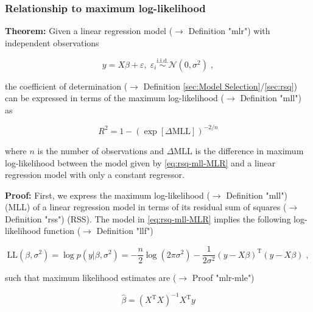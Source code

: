 \documentclass[a4paper,12pt]{book}
\begin{document}
\subsubsection[\textbf{Relationship to maximum log-likelihood}]{Relationship to maximum log-likelihood} \label{sec:rsq-mll}

\vspace{1em}
\textbf{Theorem:} Given a linear regression model ($\rightarrow$ Definition "mlr") with independent observations

\begin{equation} \label{eq:rsq-mll-MLR}
y = X\beta + \varepsilon, \; \varepsilon_i \overset{\mathrm{i.i.d.}}{\sim} \mathcal{N}(0, \sigma^2) \; ,
\end{equation}

the coefficient of determination ($\rightarrow$ Definition \ref{sec:Model Selection}/\ref{sec:rsq}) can be expressed in terms of the maximum log-likelihood ($\rightarrow$ Definition "mll") as

\begin{equation} \label{eq:rsq-mll-R2-MLL}
R^2 = 1 - \left( \exp[\Delta\mathrm{MLL}] \right)^{-2/n}
\end{equation}

where $n$ is the number of observations and $\Delta\mathrm{MLL}$ is the difference in maximum log-likelihood between the model given by \eqref{eq:rsq-mll-MLR} and a linear regression model with only a constant regressor.


\vspace{1em}
\textbf{Proof:} First, we express the maximum log-likelihood ($\rightarrow$ Definition "mll") (MLL) of a linear regression model in terms of its residual sum of squares ($\rightarrow$ Definition "rss") (RSS). The model in \eqref{eq:rsq-mll-MLR} implies the following log-likelihood function ($\rightarrow$ Definition "llf")

\begin{equation} \label{eq:rsq-mll-MLR-LL}
\mathrm{LL}(\beta,\sigma^2) = \log p(y|\beta,\sigma^2) = - \frac{n}{2} \log(2\pi\sigma^2) - \frac{1}{2\sigma^2} (y - X\beta)^\mathrm{T} (y - X\beta) \; ,
\end{equation}

such that maximum likelihood estimates are ($\rightarrow$ Proof "mlr-mle")

\begin{equation} \label{eq:rsq-mll-MLR-MLE-beta}
\hat{\beta} = (X^\mathrm{T} X)^{-1} X^\mathrm{T} y
\end{equation}
\end{document}
